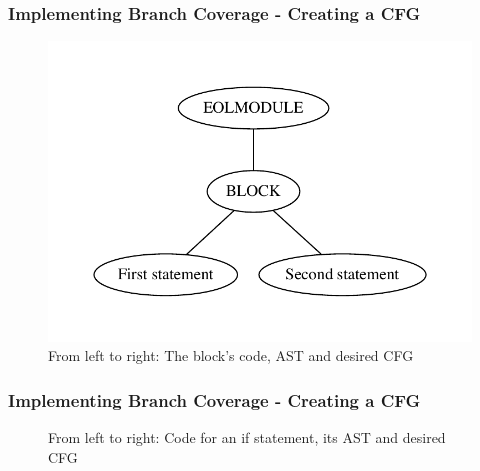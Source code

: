 \begin{frame}
\frametitle{Implementing Branch Coverage - Creating a CFG}

\begin{figure}
\centering
\begin{minipage}{.3\textwidth}
  \centering
  
\end{minipage}%
\begin{minipage}{.3\textwidth}
  \centering
  \includegraphics[width=\linewidth]{figures/statements/block_AST.pdf}
\end{minipage}
\begin{minipage}{.3\textwidth}
  \centering
\end{minipage}
\caption{From left to right: The block's code, AST and desired CFG}
\label{fig:block}
\end{figure}

\end{frame}

\begin{frame}
\frametitle{Implementing Branch Coverage - Creating a CFG}

\begin{figure}
\centering
\begin{minipage}{.3\textwidth}
  \centering
  
\end{minipage}%
\begin{minipage}{.3\textwidth}
  \centering
\end{minipage}
\begin{minipage}{.3\textwidth}
  \centering
\end{minipage}
\caption{From left to right: Code for an if statement, its AST and desired CFG}
\label{fig:if}
\end{figure}

\end{frame}

